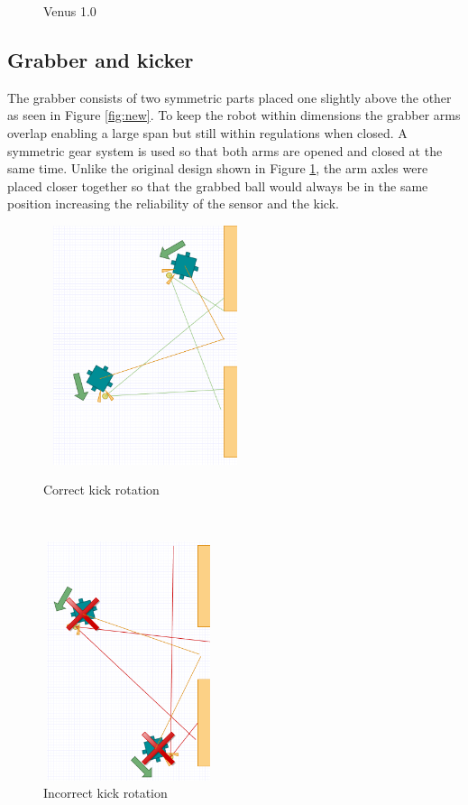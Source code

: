 \documentclass[a4paper,12pt]{article}
\begin{document}
\begin{figure}[ht]
\begin{minipage}[b]{.59\textwidth}
		\caption{Venus 1.0}
		\label{fig:old}
	\end{minipage}
\end{figure} 

\subsection{Grabber and kicker}

The grabber consists of two symmetric parts placed one slightly above the other as seen in Figure \ref{fig:new}. To keep the robot within dimensions the grabber arms overlap enabling a large span but still within regulations when closed. A symmetric gear system is used so that both arms are opened and closed at the same time. Unlike the original design shown in Figure \ref{fig:old}, the arm axles were placed closer together so that the grabbed ball would always be in the same position increasing the reliability of the sensor and the kick.
\begin{figure}[ht!]
\begin{minipage}{0.5\textwidth}
\centering
\includegraphics[width=60mm,height=70mm]{goodkick.png}
\caption{Correct kick rotation}
\label{fig:correct}
\end{minipage}
~
\begin{minipage}{0.5\textwidth}
\centering
\includegraphics[width=50mm,height=70mm]{badkick.png}
\caption{Incorrect kick rotation}
\label{fig:incorrect}
\end{minipage}
\end{figure}
\end{document}
